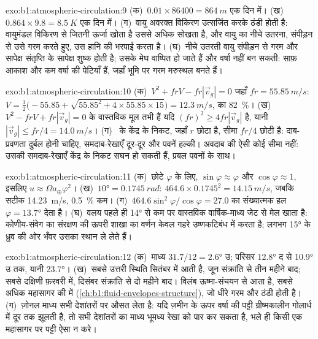 \begin{solution}{exo:b1:atmospheric-circulation:9}
(क)~$\num{0.01} \times \num{86400} = \qty{864}{m}$ एक दिन में। (ख)~$0.864 \times 9.8 =
\qty{8.5}{K}$ एक दिन में। (ग)~वायु अवरक्त विकिरण उत्सर्जित करके ठंडी होती है: वायुमंडल विकिरण से जितनी ऊर्जा खोता है उससे अधिक सोखता है, और वायु का नीचे उतरना, संपीड़न से उसे गरम करते हुए, उस हानि की भरपाई करता है। (घ)~नीचे उतरती वायु संपीड़न से गरम और सापेक्ष संतृप्ति के सापेक्ष शुष्क होती है; उसके मेघ वाष्पित हो जाते हैं और वर्षा नहीं बन सकती:  साफ़ आकाश और कम वर्षा की पेटियाँ हैं, जहाँ भूमि पर गरम मरुस्थल बनते हैं।
\end{solution}

\begin{solution}{exo:b1:atmospheric-circulation:10}
(क)~$V^2 + frV - fr|\vec v_g| = 0$ जहाँ $fr = \qty{55.85}{m/s}$:
$V = \tfrac12\bigl(-55.85 + \sqrt{55.85^2 + 4 \times 55.85 \times 15}\bigr) =
\qty{12.3}{m/s}$,  का \qty{82}{\percent}। (ख)~$V^2 - frV +
fr|\vec v_g| = 0$ के वास्तविक मूल तभी हैं यदि $(fr)^2 \geq 4fr|\vec v_g|$ है, यानी
$|\vec v_g| \leq fr/4 = \qty{14.0}{m/s}$। (ग)~ के केंद्र के निकट, जहाँ $r$ छोटा है, सीमा $fr/4$ छोटी है: दाब-प्रवणता दुर्बल होनी चाहिए, समदाब-रेखाएँ दूर-दूर और पवनें हल्की। अवदाब की ऐसी कोई सीमा नहीं: उसकी समदाब-रेखाएँ केंद्र के निकट सघन हो सकती हैं, प्रबल पवनों के साथ।
\end{solution}

\begin{solution}{exo:b1:atmospheric-circulation:11}
(क)~छोटे $\varphi$ के लिए, $\sin\varphi \approx \varphi$ और $\cos\varphi \approx 1$, इसलिए $u \approx \Omega a_\oplus\varphi^2$। (ख)~$\ang{10} = \qty{0.1745}{rad}$:
$464.6 \times 0.1745^2 = \qty{14.15}{m/s}$, जबकि सटीक \qty{14.23}{m/s},
\qty{0.5}{\percent} कम। (ग)~$464.6\sin^2\varphi/\cos\varphi = 27.0$ का संख्यात्मक हल $\varphi = \ang{13.7}$ देता है। (घ)~वलय पहले ही \ang{14} से कम पर वास्तविक वार्षिक-माध्य जेट से मेल खाता है: कोणीय-संवेग का संरक्षण  की ऊपरी शाखा का वर्णन केवल गहरे उष्णकटिबंध में करता है; लगभग \ang{15} के ध्रुव की ओर भँवर उसका स्थान ले लेते हैं।
\end{solution}

\begin{solution}{exo:b1:atmospheric-circulation:12}
(क)~माध्य $31.7/12 = \ang{2.6}$ उ; परिसर \ang{12.8} द से \ang{10.9} उ तक, यानी \ang{23.7}। (ख)~सबसे उत्तरी स्थिति सितंबर में आती है, जून संक्रांति से तीन महीने बाद; सबसे दक्षिणी फ़रवरी में, दिसंबर संक्रांति से दो महीने बाद। विलंब ऊष्मा-संचयन से आता है, सबसे अधिक महासागर की  में (\cref{ch:b1:fluid-envelopes-structure}), जो धीरे गरम और ठंडी होती है। (ग)~ज़ोनल माध्य सभी देशांतरों पर औसत लेता है: यदि ज़मीन के ऊपर वर्षा की पट्टी ग्रीष्मकालीन गोलार्ध में दूर तक झूलती है, तो सभी देशांतरों का माध्य भूमध्य रेखा को पार कर सकता है, भले ही किसी एक महासागर पर पट्टी ऐसा न करे।
\end{solution}

